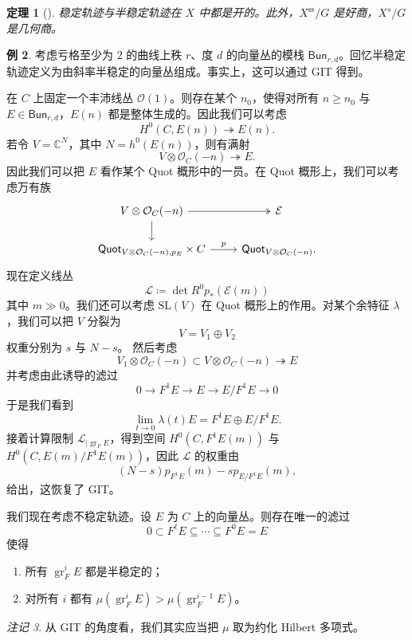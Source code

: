 \documentclass{amsart}
\newtheorem{thm}{定理}[section]
\theoremstyle{definition}
\newtheorem{exm}[thm]{例}
\theoremstyle{remark}
\newtheorem{rmk}[thm]{注记}
\theoremstyle{plain}
\theoremstyle{definition}
\theoremstyle{remark}
\newcommand{\C}{\mathbb{C}}
\newcommand{\mc}[1]{\mathcal{#1}}
\newcommand{\mr}[1]{\mathrm{#1}}
\newcommand{\on}[1]{\operatorname{#1}}
\newcommand{\ms}[1]{\mathsf{#1}}
\newcommand{\1}{\mathbf{1}}
\newcommand{\2}{\mathbf{2}}
\newcommand{\3}{\mathbf{3}}
\begin{document}
\begin{thm}[{\cite{MFK1994}}]
    稳定轨迹与半稳定轨迹在 \(X\) 中都是开的。此外，\(X^{\on{ss}}/G\) 是好商，\(X^s/G\) 是几何商。  
\end{thm}

\begin{exm}
    考虑亏格至少为 \(2\) 的曲线上秩 \(r\)、度 \(d\) 的向量丛的模栈 \(\ms{Bun}_{r,d}\)。回忆半稳定轨迹定义为由斜率半稳定的向量丛组成。事实上，这可以通过 GIT 得到。

    在 \(C\) 上固定一个丰沛线丛 \(\mc{O}(1)\)。则存在某个 \(n_0\)，使得对所有 \(n \geq n_0\) 与 \(E \in \ms{Bun}_{r,d}\)，\(E(n)\) 都是整体生成的。因此我们可以考虑
    \[ H^0(C, E(n)) \twoheadrightarrow E(n). \]
    若令 \(V = \C^N\)，其中 \(N = h^0(E(n))\)，则有满射
    \[ V \otimes \mc{O}_C(-n) \twoheadrightarrow E. \]
    因此我们可以把 \(E\) 看作某个 Quot 概形中的一员。在 Quot 概形上，我们可以考虑万有族
    \begin{equation*}
    \begin{tikzcd}
        V \otimes \mc{O}_C(-n) \ar[twoheadrightarrow]{r} \ar{d} & \mc{E} \\
        \ms{Quot}_{V \otimes \mc{O}_C(-n), p_E} \times C \ar{r}{p} & \ms{Quot}_{V \otimes \mc{O}_C(-n)}.
    \end{tikzcd}
    \end{equation*}
    现在定义线丛
    \[ \mc{L} \coloneqq \det R^0 p_* (\mc{E}(m)) \]
    其中 \(m \gg 0\)。我们还可以考虑 \(\mr{SL}(V)\) 在 Quot 概形上的作用。对某个余特征 \(\lambda\)，我们可以把 \(V\) 分裂为
    \[ V = V_1 \oplus V_2 \]
    权重分别为 \(s\) 与 \(N-s\)。 
    然后考虑
    \[ V_1 \otimes \mc{O}_C(-n) \subset V \otimes \mc{O}_C(-n) \twoheadrightarrow E \]
    并考虑由此诱导的滤过
    \[ 0 \to F^1 E \to E \to E / F^1 E \to 0 \]
    于是我们看到 
    \[ \lim_{t \to 0} \lambda(t) E = F^1 E \oplus E/F^1 E. \]
    接着计算限制 \(\mc{L}_{|\on{gr}_F E}\)，得到空间 \(H^0(C, F^1 E(m))\) 与 \(H^0(C, E(m)/F^1 E(m))\)，因此 \(\mc{L}\) 的权重由
    \[ (N-s) p_{F^1 E}(m) - s p_{E/F^1 E}(m), \]
    给出，这恢复了 GIT。
\end{exm}

我们现在考虑不稳定轨迹。设 \(E\) 为 \(C\) 上的向量丛。则存在唯一的滤过
\[ 0 \subset F^{\ell} E \subseteq \cdots \subseteq F^0 E = E \]
使得
\begin{enumerate}
    \item 所有 \(\on{gr}_F^i E\) 都是半稳定的；
    \item 对所有 \(i\) 都有 \(\mu(\on{gr}_F^i E) > \mu(\on{gr}_F^{i-1} E)\)。 
\end{enumerate}
\begin{rmk}
    从 GIT 的角度看，我们其实应当把 \(\mu\) 取为约化 Hilbert 多项式。
\end{rmk}
\end{document}
